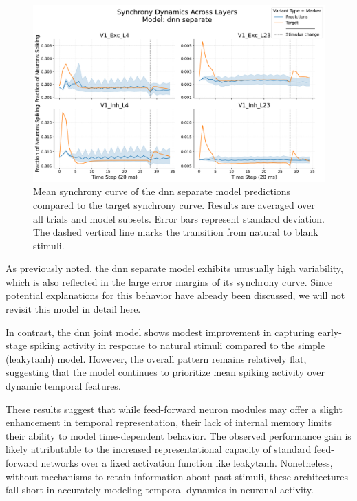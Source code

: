 \begin{figure}
    \centering
    \includegraphics[width=\linewidth]{img/plots/separate_model_synchrony_curve_dnn_separate_evaluation.pdf}
    \caption{Mean synchrony curve of the dnn separate model predictions compared to the target synchrony curve. Results are averaged over all trials and model subsets. Error bars represent standard deviation. The dashed vertical line marks the transition from natural to blank stimuli.}
    \label{fig:synchrony_curve_dnn_separate}
\end{figure}

As previously noted, the dnn separate model exhibits unusually high variability, which is also reflected in the large error margins of its synchrony curve. Since potential explanations for this behavior have already been discussed, we will not revisit this model in detail here.

In contrast, the dnn joint model shows modest improvement in capturing early-stage spiking activity in response to natural stimuli compared to the simple (leakytanh) model. However, the overall pattern remains relatively flat, suggesting that the model continues to prioritize mean spiking activity over dynamic temporal features.

These results suggest that while feed-forward neuron modules may offer a slight enhancement in temporal representation, their lack of internal memory limits their ability to model time-dependent behavior. The observed performance gain is likely attributable to the increased representational capacity of standard feed-forward networks over a fixed activation function like leakytanh. Nonetheless, without mechanisms to retain information about past stimuli, these architectures fall short in accurately modeling temporal dynamics in neuronal activity.

